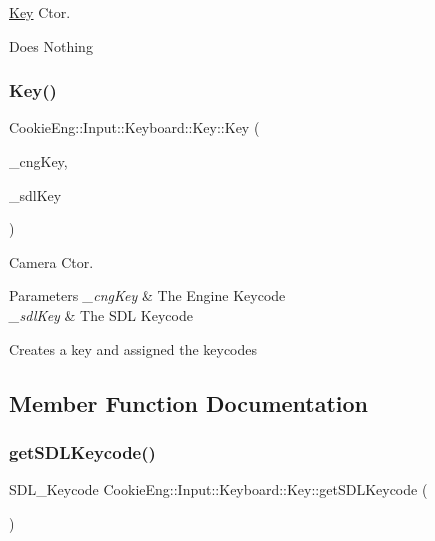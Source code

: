 \hyperlink{class_cookie_eng_1_1_input_1_1_keyboard_1_1_key}{Key} Ctor. 

Does Nothing \mbox{\label{class_cookie_eng_1_1_input_1_1_keyboard_1_1_key_a61db9dd062b7fc6a38f1a4828a9a4222}} 
\subsubsection{\texorpdfstring{Key()}{Key()}\hspace{0.1cm}{\footnotesize\ttfamily [2/2]}}
{\footnotesize\ttfamily Cookie\+Eng\+::\+Input\+::\+Keyboard\+::\+Key\+::\+Key (\begin{DoxyParamCaption}\item[{C\+N\+G\+\_\+\+Keycode}]{\+\_\+cng\+Key,  }\item[{S\+D\+L\+\_\+\+Keycode}]{\+\_\+sdl\+Key }\end{DoxyParamCaption})\hspace{0.3cm}{\ttfamily [inline]}}



Camera Ctor. 


\begin{DoxyParams}{Parameters}
{\em \+\_\+cng\+Key} & The Engine Keycode \\
\hline
{\em \+\_\+sdl\+Key} & The S\+DL Keycode\\
\hline
\end{DoxyParams}
Creates a key and assigned the keycodes 

\subsection{Member Function Documentation}
\mbox{\label{class_cookie_eng_1_1_input_1_1_keyboard_1_1_key_a61f34621eeb4872f9a8cd4bb8fc025d6}} 
\subsubsection{\texorpdfstring{get\+S\+D\+L\+Keycode()}{getSDLKeycode()}}
{\footnotesize\ttfamily S\+D\+L\+\_\+\+Keycode Cookie\+Eng\+::\+Input\+::\+Keyboard\+::\+Key\+::get\+S\+D\+L\+Keycode (\begin{DoxyParamCaption}{ }\end{DoxyParamCaption})\hspace{0.3cm}{\ttfamily [inline]}}



